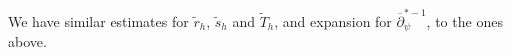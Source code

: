 \documentclass[a4paper, 10pt, twoside, notitlepage]{amsart}
\theoremstyle{plain}
\newcommand{\Om}{\Omega}
\numberwithin{equation}{section}
\newcommand {\C} {\mathbb{C}} \newcommand {\Sn} {\mathbb{S}^n}
\newcommand {\p} {\partial}
\newcommand{\ol}[1]{\overline{#1}}
\newcommand{\f}[1]{\footnote{\textcolor{blue}{#1}}}
\newcommand{\op}{\overline \p}
\begin{document}
We have similar estimates  for $\tilde r_h$, $\tilde s_h$ and $\tilde T_h$, and expansion for $\op_\psi^{*-1}$, to the ones above.


	

    
\end{document}
